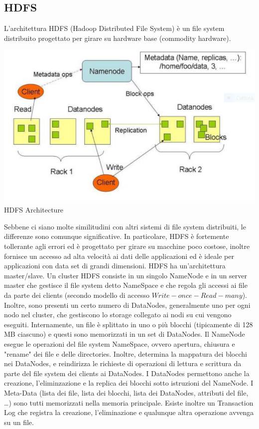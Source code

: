 \documentclass[a4page, 11pt]{article}
\begin{document}
\subsection{HDFS}
L’architettura HDFS (Hadoop Distributed File System) è un file system distribuito progettato per girare su hardware base (commodity hardware).
\begin{center}
	\includegraphics[scale=0.70]{IMAGE7.png}\\
	HDFS Architecture
\end{center}
Sebbene ci siano molte similitudini con altri sistemi di file system distribuiti, le differenze sono comunque significative. In particolare, HDFS è fortemente tollerante agli errori
ed è progettato per girare su macchine poco costose, inoltre fornisce un accesso ad alta velocità ai dati delle applicazioni ed è ideale per applicazioni con data set di grandi dimensioni. HDFS ha un’architettura master/slave. Un cluster HDFS consiste in un singolo NameNode e in un server master che gestisce il file system detto NameSpace e che regola gli accessi ai file da parte dei clients (secondo modello di accesso $Write-once-Read-many$). Inoltre, sono presenti un certo numero di DataNodes, generalmente uno per ogni nodo nel cluster, che gestiscono lo storage collegato ai nodi su cui vengono eseguiti. Internamente, un file è splittato in uno o più blocchi (tipicamente di 128 MB ciascuno) e questi sono memorizzati in un set di DataNodes. Il NameNode esegue le operazioni del file system NameSpace, ovvero apertura, chiusura e "rename" dei file e delle directories. Inoltre, determina la mappatura dei blocchi nei DataNodes, e reindirizza le richieste di operazioni di lettura e scrittura da parte del file system dei clients ai DataNodes. I DataNodes permettono anche la creazione, l’eliminzazione e la replica dei blocchi sotto istruzioni del NameNode. I Meta-Data (lista dei file, lista dei blocchi, lista dei DataNodes, attributi del file, …) sono tutti memorizzati nella memoria principale. Esiste inoltre un Transaction Log che registra la creazione, l’eliminazione e qualunque altra operazione avvenga su un file.
\end{document}

